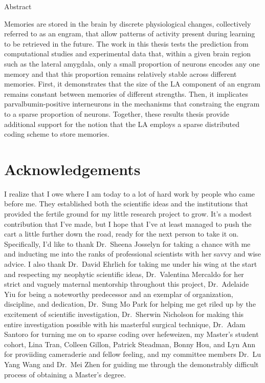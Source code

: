 \documentclass[12pt,a4paper,]{report}
\begin{document}
\normalsize
{}

\Large
\noindent
Abstract

\normalsize
{} \noindent
Memories are stored in the brain by discrete physiological changes,
collectively referred to as an engram, that allow patterns of activity
present during learning to be retrieved in the future. The work in this
thesis tests the prediction from computational studies and experimental
data that, within a given brain region such as the lateral amygdala,
only a small proportion of neurons encodes any one memory and that this
proportion remains relatively stable across different memories. First,
it demonstrates that the size of the LA component of an engram remains
constant between memories of different strengths. Then, it implicates
parvalbumin-positive interneurons in the mechanisms that constraing the
engram to a sparse proportion of neurons. Together, these results thesis
provide additional support for the notion that the LA employs a sparse
distributed coding scheme to store memories.


\chapter*{Acknowledgements}\label{acknowledgements}

I realize that I owe where I am today to a lot of hard work by people
who came before me. They established both the scientific ideas and the
institutions that provided the fertile ground for my little research
project to grow. It's a modest contribution that I've made, but I hope
that I've at least managed to push the cart a little further down the
road, ready for the next person to take it on. Specifically, I'd like to
thank Dr.~Sheena Josselyn for taking a chance with me and inducting me
into the ranks of professional scientists with her savvy and wise
advice. I also thank Dr.~David Ehrlich for taking me under his wing at
the start and respecting my neophytic scientific ideas, Dr.~Valentina
Mercaldo for her strict and vaguely maternal mentorship throughout this
project, Dr.~Adelaide Yiu for being a noteworthy predecessor and an
exemplar of organization, discipline, and dedication, Dr.~Sung Mo Park
for helping me get riled up by the excitement of scientific
investigation, Dr.~Sherwin Nicholson for making this entire
investigation possible with his masterful surgical technique, Dr.~Adam
Santoro for turning me on to sparse coding over hefeweizen, my Master's
student cohort, Lina Tran, Colleen Gillon, Patrick Steadman, Bonny Hou,
and Lyn Ann for proviiding cameraderie and fellow feeling, and my
committee members Dr.~Lu Yang Wang and Dr.~Mei Zhen for guiding me
through the demonstrably difficult process of obtaining a Master's
degree.
\end{document}
